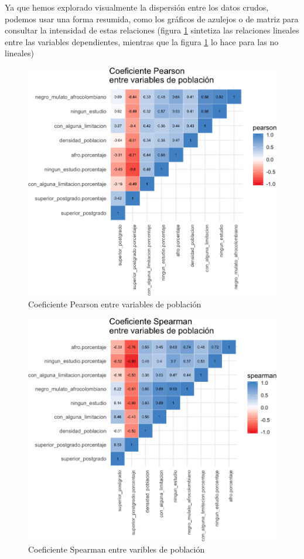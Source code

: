 \documentclass[12pt,]{book}
\begin{document}
Ya que hemos explorado visualmente la dispersión entre los datos crudos,
podemos usar una forma resumida, como los gráficos de azulejos o de
matriz para consultar la intensidad de estas relaciones (figura
\ref{fig:tile-poblacion-pearson} sintetiza las relaciones lineales entre
las variables dependientes, mientras que la figura
\ref{fig:tile-poblacion-pearson} lo hace para las no lineales)

\begin{figure}
\includegraphics[width=1\linewidth]{tesis-unigis_files/figure-latex/tile-poblacion-pearson-1} \caption{Coeficiente Pearson entre variables de población}\label{fig:tile-poblacion-pearson}
\end{figure}

\begin{figure}
\includegraphics[width=1\linewidth]{tesis-unigis_files/figure-latex/tile-poblacion-spearman-1} \caption{Coeficiente Spearman entre varibles de población}\label{fig:tile-poblacion-spearman}
\end{figure}
\end{document}
